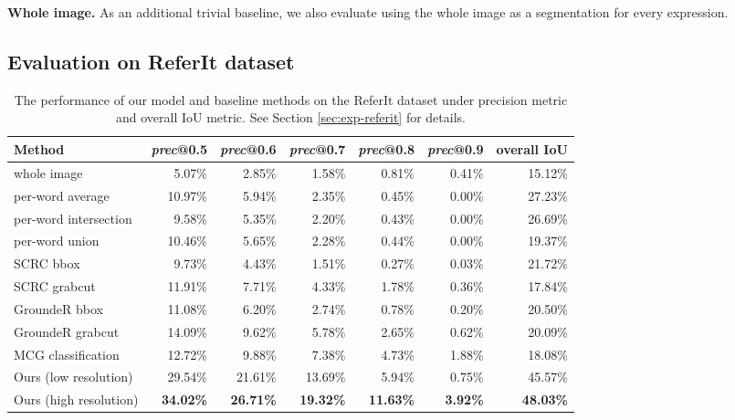 \documentclass[runningheads]{llncs}
\begin{document}
\textbf{Whole image.} As an additional trivial baseline, we also evaluate using the whole image as a segmentation for every expression.

\subsection{Evaluation on ReferIt dataset}

\begin{table}[t]
\begin{center}
\begin{tabular}{|l|r|r|r|r|r||r|}
\hline
\textbf{Method} & \textit{prec}@0.5 & \textit{prec}@0.6 & \textit{prec}@0.7 & \textit{prec}@0.8 & \textit{prec}@0.9 & overall IoU \\
\hline
whole image    										&  5.07\% & 2.85\% & 1.58\% & 0.81\% & 0.41\% & 15.12\% \\
per-word average    								    & 10.97\% & 5.94\% & 2.35\% & 0.45\% & 0.00\% & 27.23\% \\
per-word intersection 								&  9.58\% & 5.35\% & 2.20\% & 0.43\% & 0.00\% & 26.69\% \\
per-word union     									& 10.46\% & 5.65\% & 2.28\% & 0.44\% & 0.00\% & 19.37\% \\
SCRC \cite{hu2015natural} bbox 				        &  9.73\% & 4.43\% & 1.51\% & 0.27\% & 0.03\% & 21.72\% \\
SCRC \cite{hu2015natural} grabcut 				    & 11.91\% & 7.71\% & 4.33\% & 1.78\% & 0.36\% & 17.84\% \\
GroundeR \cite{rohrbach2015grounding} bbox 			& 11.08\% & 6.20\% & 2.74\% & 0.78\% & 0.20\% & 20.50\% \\
GroundeR \cite{rohrbach2015grounding} grabcut 		& 14.09\% & 9.62\% & 5.78\% & 2.65\% & 0.62\% & 20.09\% \\
MCG classification    								& 12.72\% & 9.88\% & 7.38\% & 4.73\% & 1.88\% & 18.08\% \\
\hline
Ours (low resolution)      & 29.54\% & 21.61\% & 13.69\% & 5.94\% & 0.75\% & 45.57\%  \\
Ours (high resolution)       & \textbf{34.02\%} & \textbf{26.71\%} & \textbf{19.32\%} & \textbf{11.63\%} &  \textbf{3.92\%} & \textbf{48.03\%}  \\
\hline
\end{tabular}
\end{center}
\caption{The performance of our model and baseline methods on the ReferIt dataset under precision metric and overall IoU metric. See Section \ref{sec:exp-referit} for details.}
\label{tab:results_referit}
\end{table}
\end{document}
